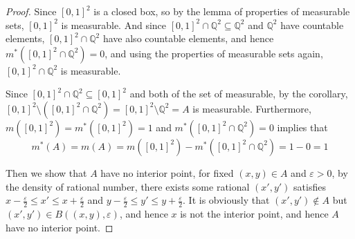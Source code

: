 \begin{proof}
    Since $[0, 1]^2$ is a closed box, so by the lemma of properties of measurable sets, $[0,1]^2$ is measurable. And since $[0,1]^2 \cap \mathbb{Q}^2 \subseteq \mathbb{Q}^2$ and $\mathbb{Q}^2$ have countable elements,  $[0,1]^2 \cap \mathbb{Q}^2$ have also countable elements, and hence $m^*([0,1]^2 \cap \mathbb{Q}^2) = 0$, and using the properties of measurable sets again, $[0,1]^2 \cap \mathbb{Q}^2$ is measurable.

    Since $[0,1]^2 \cap \mathbb{Q}^2 \subseteq [0,1]^2$ and both of the set of measurable, by the corollary, $[0,1]^2 \setminus ([0,1]^2 \cap \mathbb{Q}^2) = [0,1]^2 \setminus \mathbb{Q}^2 = A$ is measurable. Furthermore, $m([0,1]^2) = m^*([0,1]^2) = 1$ and  $m^*([0,1]^2 \cap \mathbb{Q}^2) = 0$ implies that 
    \[
        m^*(A) = m(A) = m([0,1]^2) - m^*([0,1]^2 \cap \mathbb{Q}^2) = 1-0= 1
    \]

    Then we show that $A$ have no interior point, for fixed $(x,y) \in A$ and $\varepsilon >0$, by the density of rational number, there exists some rational $(x',y')$ satisfies $x-\frac{\varepsilon}{2} \le x' \le x+\frac{\varepsilon}{2}$ and $y-\frac{\varepsilon}{2} \le y' \le y+\frac{\varepsilon}{2}$. It is obviously that $(x', y') \notin A$ but $(x', y') \in B((x,y), \varepsilon)$, and hence $x$ is not the interior point, and hence $A$ have no interior point.

\end{proof}
